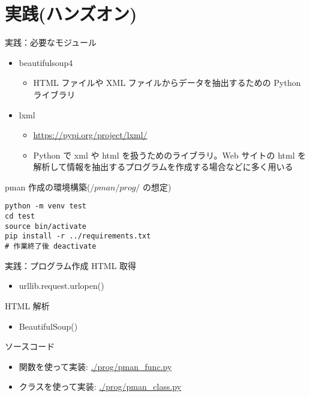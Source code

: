 \documentclass[compress,dvipdfmx,11pt]{beamer}
\begin{document}
\section{実践(ハンズオン)}
\label{sec:orgab97f37}
\begin{frame}[label={sec:orgd07209d},fragile]{実践：必要なモジュール}
 \begin{itemize}
\item beautifulsoup4
\begin{itemize}
\item HTML ファイルや XML ファイルからデータを抽出するための Python ライブラリ
\end{itemize}
\item lxml
\begin{itemize}
\item \url{https://pypi.org/project/lxml/}
\item Python で xml や html を扱うためのライブラリ。Web サイトの html を
解析して情報を抽出するプログラムを作成する場合などに多く用いる
\end{itemize}
\end{itemize}

pman 作成の環境構築(\(/pman/prog/\) の想定)
\begin{verbatim}
python -m venv test
cd test
source bin/activate
pip install -r ../requirements.txt
# 作業終了後 deactivate
\end{verbatim}
\end{frame}

\begin{frame}[label={sec:org1bddfc1}]{実践：プログラム作成}
HTML 取得
\begin{itemize}
\item urllib.request.urlopen()
\end{itemize}


HTML 解析
\begin{itemize}
\item BeautifulSoup()
\end{itemize}


ソースコード
\begin{itemize}
\item 関数を使って実装:  \url{./prog/pman\_func.py}
\item クラスを使って実装: \url{./prog/pman\_class.py}
\end{itemize}
\end{frame}
\end{document}
